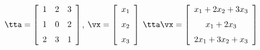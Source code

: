 {$\tta = \left[ \begin {array}{ccc} 1&2&3\\\noalign{\medskip}1&0&2
\\\noalign{\medskip}2&3&1\end {array} \right]$,\quad  
$\vx = \left[ \begin {array}{c} x_1\\\noalign{\medskip}x_2\\\noalign{\medskip}
x_3\end {array} \right] $}
{$\tta\vx= \left[ \begin {array}{c} x_1+2x_2+3x_3\\\noalign{\medskip}x_1+2x_3\\\noalign{\medskip}2x_1+3x_2+x_3\end {array} \right] $
}
 
 

 

 

